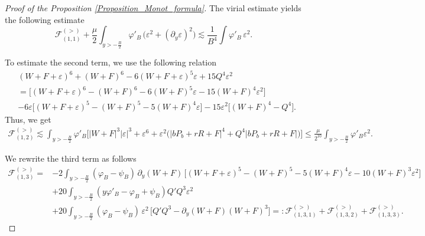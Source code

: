 \documentclass[16pt,english, oneside,reqno]{smfart}
\newcommand{\vare}{{\varepsilon}}
\newcommand{\vphi}{{\varphi}}
\begin{document}
\begin{proof}[Proof of the Proposition \ref{Proposition_Monot_formula}]
\vspace{0.4cm}
The virial estimate yields the following estimate
\begin{equation}
    \mathcal{F}_{(1,1)}^{(>)} + \frac \mu 2  \int_{y>-\frac B2} \vphi'_B\, \big( \vare^2 + (\partial_y \vare)^2 \big) \lesssim \frac{1}{B^4}\int \vphi'_B \, \vare^2.
\end{equation}


To estimate the second term, we use the following relation
\begin{equation}
\begin{split}
    & (W+F+\vare)^6+(W+F)^6-6(W+F+\vare)^5\vare + 15Q^4 \vare^2 \\
    & =\big[ (W+F+\vare)^6 - (W+F)^6 - 6(W+F)^5\vare -15(W+F)^4\vare^2 \big]\\
    & 
    -6\vare \big[ (W+F+\vare)^5-(W+F)^5 - 5(W+F)^4\vare \big] - 15\vare^2\big[ (W+F)^4 - Q^4\big].
\end{split}
\end{equation}
Thus, we get 
\begin{equation}
    \begin{split}
        \mathcal{F}_{(1,2)}^{(>)} \lesssim \int_{y>-\frac B2} \vphi'_B  \big[ |W+F|^3|\vare|^3  + \vare^6 + \vare^2 \big( |bP_b+rR + F|^4 + Q^4|bP_b +rR + F| \big) \big]
        \leq \frac{\mu}{2^{10}}\int_{y>-\frac B2} \vphi'_B \vare^2.
    \end{split}
\end{equation}

We rewrite the third term as follows
\begin{equation}
    \begin{split}
        \mathcal{F}_{(1,3)}^{(>)} =
        & -2\int_{y>-\frac B2} (\vphi_B-\psi_B)\,\partial_y(W+F)\,\big[ (W+F+\vare)^5 - (W+F)^5 - 5(W+F)^4\vare -10(W+F)^3\vare^2 \big]\\
        & +20\int_{y>-\frac B2} (y \vphi'_B - \vphi_B + \psi_B) Q'Q^3 \vare^2\\
        & + 20\int_{y>-\frac B2} (\vphi_B-\psi_B)\,\vare^2\,\big[ Q'Q^3 - \partial_y(W+F)(W+F)^3\big] =: \mathcal{F}_{(1,3,1)}^{(>)} + \mathcal{F}_{(1,3,2)}^{(>)} + \mathcal{F}_{(1,3,3)}^{(>)}.
    \end{split}
\end{equation}


\end{proof}
\end{document}
